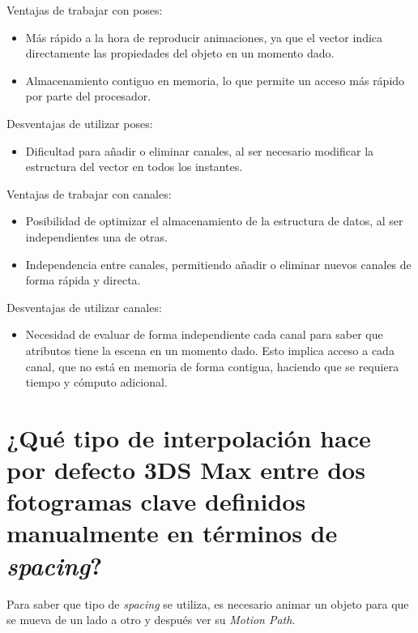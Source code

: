 \documentclass[draft]{article}
\begin{document}
Ventajas de trabajar con poses: 

\begin{itemize}
    \item Más rápido a la hora de reproducir animaciones, ya que el vector indica directamente las propiedades del objeto en un momento dado.
    \item Almacenamiento contiguo en memoria, lo que permite un acceso más rápido por parte del procesador.
\end{itemize}

\bigskip

Desventajas de utilizar poses:

\begin{itemize}
    \item Dificultad para añadir o eliminar canales, al ser necesario modificar la estructura del vector en todos los instantes.
\end{itemize}

Ventajas de trabajar con canales:

\begin{itemize}
    \item Posibilidad de optimizar el almacenamiento de la estructura de datos, al ser independientes una de otras.
    \item Independencia entre canales, permitiendo añadir o eliminar nuevos canales de forma rápida y directa.
\end{itemize}

Desventajas de utilizar canales:

\begin{itemize}
    \item Necesidad de evaluar de forma independiente cada canal para saber que atributos tiene la escena en un momento dado. Esto implica acceso a cada canal, que no está en memoria de forma contigua, haciendo que se requiera tiempo y cómputo adicional.
\end{itemize}

\section{¿Qué tipo de interpolación hace por defecto 3DS Max entre dos fotogramas clave definidos manualmente en términos de \textit{spacing}?}

Para saber que tipo de \textit{spacing} se utiliza, es necesario animar un objeto para que se mueva de un lado a otro y después ver su \textit{Motion Path}.
\end{document}
